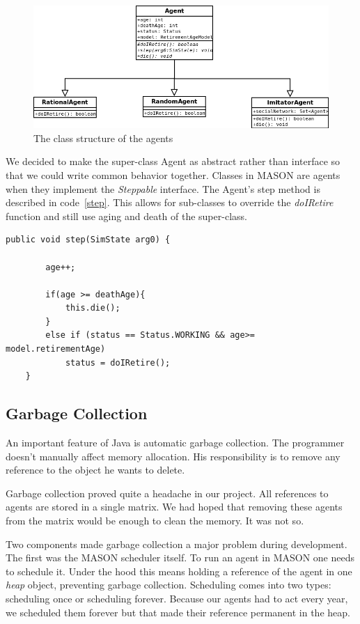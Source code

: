 \documentclass[runningheads,a4paper]{llncs}
\begin{document}
\begin{figure}
 \begin{center}
  \includegraphics[scale=.45]{figs/UML.png}
\caption{The class structure of the agents}
\label{UML}
 \end{center}
\end{figure}

We decided to make the super-class Agent as abstract rather than interface so that we could write common behavior together.
Classes in MASON are agents when they implement the \textit{Steppable} interface.
The Agent's step method is described in code~\ref{step}.
This allows for sub-classes to override the \textit{doIRetire} function and still use aging and death of the super-class.
{
\linespread{1}
\begin{lstlisting}[float,caption= {Agent's step class}, label={step}]
public void step(SimState arg0) {
		
		age++;

		if(age >= deathAge){
			this.die();
		}
		else if (status == Status.WORKING && age>= model.retirementAge)	
			status = doIRetire();	
	}

\end{lstlisting}
}

\subsection{Garbage Collection}

An important feature of Java is automatic garbage collection.
The programmer doesn't manually affect memory allocation. 
His responsibility is to remove any reference to the object he wants to delete.

Garbage collection proved quite a headache in our project.
All references to agents are stored in a single matrix.
We had hoped that removing these agents from the matrix would be enough to clean the memory.
It was not so.

Two components made garbage collection a major problem during development.
The first was the MASON scheduler itself.
To run an agent in MASON one needs to schedule it.
Under the hood this means holding a reference of the agent in one \textit{heap} object, preventing garbage collection.
Scheduling comes into two types: scheduling once or scheduling forever.
Because our agents had to act every year, we scheduled them forever but that made their reference permanent in the heap.
\end{document}
